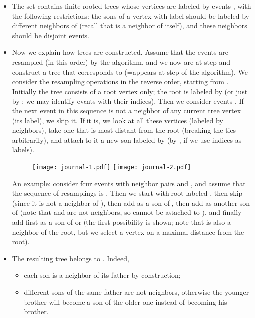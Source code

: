 \documentclass[12pt]{article}
\begin{document}
\begin{itemize}
\item The set  contains finite rooted trees whose vertices are labeled by events , with the following restrictions: the sons of a vertex with label  should be labeled by different neighbors of  (recall that  is a neighbor of itself), and these neighbors should be disjoint events.

\item Now we explain how trees are constructed. Assume that the events  are resampled (in this order) by the algorithm, and we now are at step  and construct a tree  that corresponds to  (=appears at step  of the algorithm). We consider the resampling operations in the reverse order, starting from . Initially the tree consists of a root vertex only; the root is labeled by  (or just by ; we may identify events with their indices). Then we consider events . If the next event  in this sequence is not a neighbor of any current tree vertex (its label), we skip it. If it is, we look at all these vertices (labeled by neighbors), take one that is most distant from the root (breaking the ties arbitrarily), and attach to it a new son labeled by  (by , if we use indices as labels).
\bigskip

\begin{figure}[h]
\begin{center}
\texttt{[image: journal-1.pdf]}\hspace*{20mm}
\texttt{[image: journal-2.pdf]}
\end{center}
\end{figure}
An example: consider four events  with neighbor pairs  and , and assume that the sequence of resamplings is . Then we start with root labeled , then skip  (since it is not a neighbor of ), then add  as a son of , then add  as another son of  (note that  and  are not neighbors, so  cannot be attached to ), and finally add first  as a son of  or  (the first possibility is shown; note that  is also a neighbor of the root, but we select a vertex on a maximal distance from the root).

\item The resulting tree belongs to . Indeed,

\begin{itemize}
\item each son is a neighbor of its father by construction;
\item different sons of the same father are not neighbors, otherwise the younger brother will become a son of the older one instead of becoming his brother.
\end{itemize}


\end{itemize}
\end{document}
